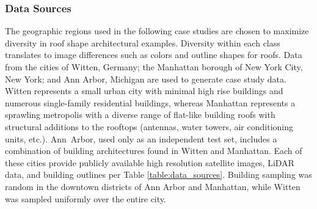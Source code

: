 \subsubsection{Data Sources}
The geographic regions used in the following case studies are chosen to maximize diversity in roof shape architectural examples. Diversity within each class translates to image differences such as colors and outline shapes for roofs.  Data from the cities of Witten, Germany; the Manhattan borough of New York City, New York; and Ann Arbor, Michigan are used to generate case study data. Witten represents a small urban city with minimal high rise buildings and numerous single-family residential buildings, whereas Manhattan represents a sprawling metropolis with a diverse range of flat-like building roofs with structural additions to the rooftops (antennas, water towers, air conditioning units, etc.). Ann~Arbor, used only as an independent test set, includes a combination of building architectures found in Witten and Manhattan.  Each of these cities provide publicly available high resolution satellite images, LiDAR data, and building outlines per Table \ref{table:data_sources}. Building sampling was random in the downtown districts of Ann Arbor and Manhattan, while Witten was sampled uniformly over the entire city.


\begin{table}[H]
\centering
\caption{Satellite, LiDAR, and building data sources}\label{table:data_sources}
\end{table}

